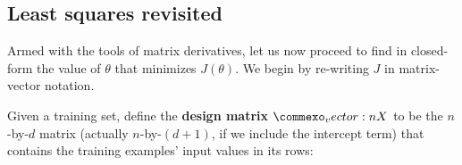 \subsection{Least squares revisited}


Armed with the tools of matrix derivatives, let us now proceed to find in
closed-form the value of $\theta$ that minimizes $J(\theta)$. We begin by re-writing $J$ in
matrix-vector notation. %

Given a training set, define the \textbf{design matrix} $\mat X$ to be the $n$-by-$d$ matrix
(actually $n$-by-$(d + 1)$, if we include the intercept term) that contains the %
training examples' input values in its rows:

